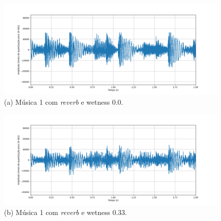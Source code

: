\begin{figure}[htpb]
    \centering
    \begin{minipage}[b]{0.7\textwidth}
        \centering
        \includegraphics[width=\textwidth]{figuras/fig93.png}
        \vspace{0.3cm} %
        (a) Música 1 com \textit{reverb} e wetness 0.0.
    \end{minipage}
    \hspace{0.5cm} %

    \begin{minipage}[b]{0.7\textwidth}
        \centering
        \includegraphics[width=\textwidth]{figuras/fig94.png}
        \vspace{0.3cm} %
        (b) Música 1 com \textit{reverb} e wetness 0.33.
    \end{minipage}
    
    \vspace{0.5cm} %


\end{figure}
